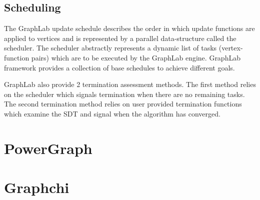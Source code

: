 \documentclass {report}
\begin{document}
\subsection{Scheduling}
The GraphLab update schedule describes the order in
which update functions are applied to vertices and is represented by a parallel data-structure called the scheduler.
The scheduler abstractly represents a dynamic list of tasks
(vertex-function pairs) which are to be executed by the
GraphLab engine. GraphLab framework provides a collection of base schedules to achieve different goals.

GraphLab also provide 2 termination assessment methods. The first method relies on
the scheduler which signals termination when there are no
remaining tasks. The second termination
method relies on user provided termination functions which
examine the SDT and signal when the algorithm has converged.


\section{PowerGraph}
\section{Graphchi}
\end{document}
